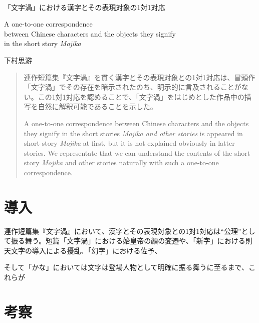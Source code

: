 \documentclass[10pt, a5paper, twoside]{jsarticle}
\theoremstyle{definition}
\begin{document}
	{\Large 　} %

	\begin{center}

		\Large{「文字渦」における漢字とその表現対象の1対1対応}

		\vspace{3mm}

		\large{A one-to-one correspondence \\ between Chinese characters and the objects they signify \\ in the short story \textit{Mojika}}

		\vspace{3mm}
		
		\large{下村思游}

	\end{center}

	\vspace{3mm}

	\begin{abstract}

		連作短篇集『文字渦』を貫く漢字とその表現対象との1対1対応は、冒頭作「文字渦」でその存在を暗示されたのち、明示的に言及されることがない。この1対1対応を認めることで、「文字渦」をはじめとした作品中の描写を自然に解釈可能であることを示した。

		\vspace{3mm}

		A one-to-one correspondence between Chinese characters and the objects they signify in the short stories \textit{Mojika and other stories} is appeared in short story \textit{Mojika} at first, but it is not explained obviously in latter stories. We representate that we can understand the contents of the short story \textit{Mojika} and other stories naturally with such a one-to-one correspondence.

	\end{abstract}

	\section{導入}

		連作短篇集『文字渦』において、漢字とその表現対象との1対1対応は“公理”として振る舞う。短篇「文字渦」における始皇帝の顔の変遷や、「新字」における則天文字の導入による擾乱、「幻字」における佐予、

		そして「かな」においては文字は登場人物として明確に振る舞うに至るまで、これらが

	\section{考察}
\end{document}
